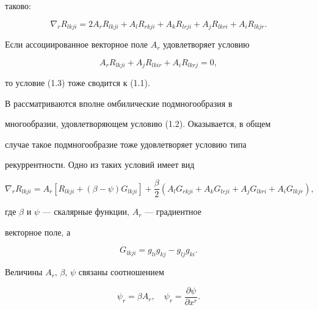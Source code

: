 таково: 


\begin{equation} 


\nabla_r R_{lkji}=2A_r R_{lkji}+A_l R_{rkji}+ 


A_k R_{lrji}+A_j R_{lkri}+A_i R_{lkjr}. 


\end{equation} 


Если ассоциированное векторное поле $A_r$ удовлетворяет условию 


$$ 


A_r R_{lkji}+A_j R_{lkir}+A_i R_{lkrj}=0, 


$$ 


то условие (1.3) тоже сводится к (1.1). 


 


В \cite{13} рассматриваются вполне омбилические подмногообразия в 


многообразии, удовлетворяющем условию (1.2). Оказывается, в общем 


случае такое подмногообразие тоже удовлетворяет условию типа 


рекуррентности. Одно из таких условий имеет вид 


\begin{equation} 


\nabla_r R_{lkji}=A_r[R_{lkji}+(\beta-\psi)G_{lkji}]+ 


\frac{\beta}{2}(A_l G_{rkji}+A_k G_{lrji}+ 


A_j G_{lkri}+A_i G_{lkjr}), 


\end{equation} 


где $\beta$ и $\psi$ --- скалярные функции, $A_r$ --- градиентное 


векторное поле, а 


\begin{equation} 


G_{lkji}=g_{li}g_{kj}-g_{lj}g_{ki}. 


\end{equation} 


Величины $A_r$, $\beta$, $\psi$ связаны соотношением 


\begin{equation} 


\psi_r=\beta A_r,\quad \psi_r=\frac{\partial\psi}{\partial x^r}. 


\end{equation} 


